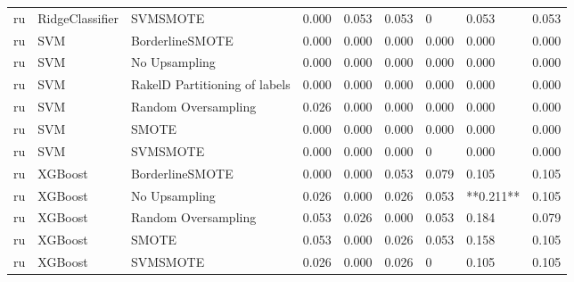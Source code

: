 \begin{tabular}{lllllllll}
      ru &                 RidgeClassifier &                      SVMSMOTE &     0.000 &                     0.053 &                 0.053 &                      0 &                                   0.053 &     0.053 \\
      ru &                             SVM &               BorderlineSMOTE &     0.000 &                     0.000 &                 0.000 &                  0.000 &                                   0.000 &     0.000 \\
      ru &                             SVM &                 No Upsampling &     0.000 &                     0.000 &                 0.000 &                  0.000 &                                   0.000 &     0.000 \\
      ru &                             SVM & RakelD Partitioning of labels &     0.000 &                     0.000 &                 0.000 &                  0.000 &                                   0.000 &     0.000 \\
      ru &                             SVM &           Random Oversampling &     0.026 &                     0.000 &                 0.000 &                  0.000 &                                   0.000 &     0.000 \\
      ru &                             SVM &                         SMOTE &     0.000 &                     0.000 &                 0.000 &                  0.000 &                                   0.000 &     0.000 \\
      ru &                             SVM &                      SVMSMOTE &     0.000 &                     0.000 &                 0.000 &                      0 &                                   0.000 &     0.000 \\
      ru &                         XGBoost &               BorderlineSMOTE &     0.000 &                     0.000 &                 0.053 &                  0.079 &                                   0.105 &     0.105 \\
      ru &                         XGBoost &                 No Upsampling &     0.026 &                     0.000 &                 0.026 &                  0.053 &                               **0.211** &     0.105 \\
      ru &                         XGBoost &           Random Oversampling &     0.053 &                     0.026 &                 0.000 &                  0.053 &                                   0.184 &     0.079 \\
      ru &                         XGBoost &                         SMOTE &     0.053 &                     0.000 &                 0.026 &                  0.053 &                                   0.158 &     0.105 \\
      ru &                         XGBoost &                      SVMSMOTE &     0.026 &                     0.000 &                 0.026 &                      0 &                                   0.105 &     0.105 \\
\bottomrule
\end{tabular}
